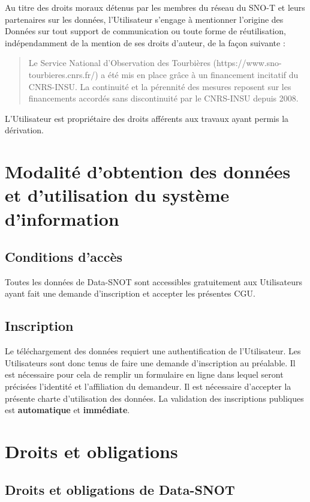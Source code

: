 \documentclass[]{article}
\begin{document}
Au titre des droits moraux détenus par les membres du réseau du SNO-T et leurs partenaires sur les données, l’Utilisateur s’engage à mentionner l’origine des Données sur tout support de communication ou toute forme de réutilisation, indépendamment de la mention de ses droits d’auteur, de la façon suivante :

\begin{quotation}
	\og{}Le Service National d'Observation des Tourbières (https://www.sno-tourbieres.cnrs.fr/) a été mis en place grâce à un financement incitatif du CNRS-INSU. La continuité et la pérennité des mesures reposent sur les financements accordés sans discontinuité par le CNRS-INSU depuis 2008.\fg{}
\end{quotation}

L'Utilisateur est propriétaire des droits afférents aux travaux ayant permis la dérivation.

\section{Modalité d'obtention des données et d'utilisation du système d'information}

\subsection{Conditions d'accès}

Toutes les données de Data-SNOT sont accessibles gratuitement aux Utilisateurs ayant fait une demande d'inscription et accepter les présentes CGU.

\subsection{Inscription}

Le téléchargement des données requiert une authentification de l’Utilisateur. Les Utilisateurs sont donc tenus de faire une demande d'inscription au préalable.
Il est nécessaire pour cela de remplir un formulaire en ligne dans lequel seront précisées l'identité et l'affiliation du demandeur. Il est nécessaire d'accepter la présente charte d’utilisation des données. La validation des inscriptions publiques est \textbf{automatique} et \textbf{immédiate}.

\section{Droits et obligations}

\subsection{Droits et obligations de Data-SNOT}
\end{document}
